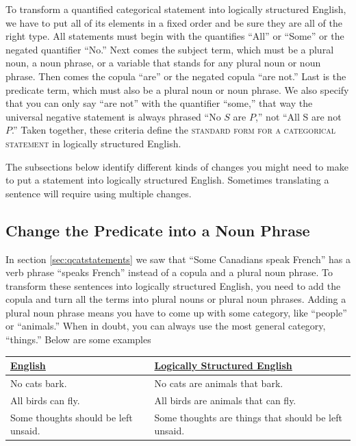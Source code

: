 To transform a quantified categorical statement into logically structured English, we have to put all of its elements in a fixed order and be sure they are all of the right type. All statements must begin with the quantifies ``All'' or ``Some'' or the negated quantifier ``No.'' Next comes the subject term, which must be a plural noun, a noun phrase, or a variable that stands for any plural noun or noun phrase. Then comes the copula ``are'' or the negated copula ``are not.'' Last is the predicate term, which must also be a plural noun or noun phrase. We also specify that you can only say ``are not'' with the quantifier ``some,'' that way the universal negative statement is always phrased ``No $S$ are $P$,'' not ``All S are not $P$.'' Taken together, these criteria define the \textsc{\gls{standard form for a categorical statement}} in logically structured English. \label{def:standard_form_cat_statement}

The subsections below identify different kinds of changes you might need to make to put a statement into logically structured English. Sometimes translating a sentence will require using multiple changes.

\subsection{Change the Predicate into a Noun Phrase}
\label{subsec:predicate_noun_phrase}
In section \ref{sec:qcatstatements} we saw that ``Some Canadians speak French'' has a verb phrase ``speaks French'' instead of a copula and a plural noun phrase. To transform these sentences into logically structured English, you need to add the copula and turn all the terms into plural nouns or plural noun phrases. Adding a plural noun phrase means you have to come up with some category, like ``people'' or ``animals.'' When in doubt, you can always use the most general category, ``things.'' Below are some examples

\begin{longtabu}{p{.5\linewidth}p{.5\linewidth}}
\underline{English} &
\underline{Logically Structured English} \\
\endhead
No cats bark. &
No cats are animals that bark.  \\

All birds can fly. &
All birds are animals that can fly.  \\

Some thoughts should be left unsaid. &
Some thoughts are things that should be left unsaid.
\end{longtabu}

